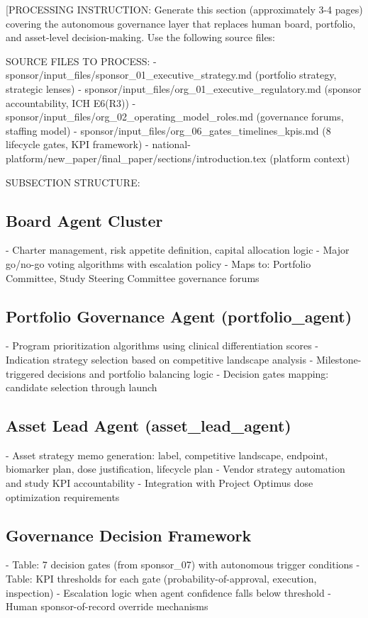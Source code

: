 
[PROCESSING INSTRUCTION: Generate this section (approximately 3-4 pages) covering the autonomous
governance layer that replaces human board, portfolio, and asset-level decision-making. Use the
following source files:

SOURCE FILES TO PROCESS:
- sponsor/input\_files/sponsor\_01\_executive\_strategy.md (portfolio strategy, strategic lenses)
- sponsor/input\_files/org\_01\_executive\_regulatory.md (sponsor accountability, ICH E6(R3))
- sponsor/input\_files/org\_02\_operating\_model\_roles.md (governance forums, staffing model)
- sponsor/input\_files/org\_06\_gates\_timelines\_kpis.md (8 lifecycle gates, KPI framework)
- national-platform/new\_paper/final\_paper/sections/introduction.tex (platform context)

SUBSECTION STRUCTURE:
\subsection{Board Agent Cluster}
- Charter management, risk appetite definition, capital allocation logic
- Major go/no-go voting algorithms with escalation policy
- Maps to: Portfolio Committee, Study Steering Committee governance forums

\subsection{Portfolio Governance Agent (portfolio\_agent)}
- Program prioritization algorithms using clinical differentiation scores
- Indication strategy selection based on competitive landscape analysis
- Milestone-triggered decisions and portfolio balancing logic
- Decision gates mapping: candidate selection through launch

\subsection{Asset Lead Agent (asset\_lead\_agent)}
- Asset strategy memo generation: label, competitive landscape, endpoint,
  biomarker plan, dose justification, lifecycle plan
- Vendor strategy automation and study KPI accountability
- Integration with Project Optimus dose optimization requirements

\subsection{Governance Decision Framework}
- Table: 7 decision gates (from sponsor\_07) with autonomous trigger conditions
- Table: KPI thresholds for each gate (probability-of-approval, execution, inspection)
- Escalation logic when agent confidence falls below threshold
- Human sponsor-of-record override mechanisms

